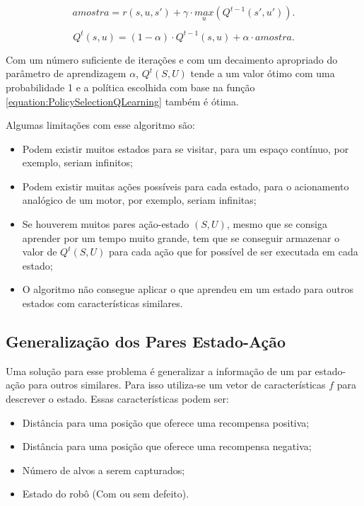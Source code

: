 \begin{equation} \label{equation:AmostraQLearning}
	amostra = r \left( s, u, s' \right) + \gamma \cdot \underset{u}{max} \left( Q^{t-1} \left( s', u' \right) \right).
\end{equation}

\begin{equation} \label{equation:QUpdateQLearning}
	Q^t \left( s, u \right) = \left( 1 - \alpha \right) \cdot Q^{t-1} \left( s, u \right) + \alpha \cdot amostra.
\end{equation}

Com um número suficiente de iterações e com um decaimento apropriado do parâmetro de aprendizagem $ \alpha $, $ Q^t \left( S, U \right) $ tende a um valor ótimo  com uma probabilidade 1 \cite{journals:ml:Tsitsiklis94,Jaakkola94convergenceof,Watkins:1989} e a política escolhida com base na função \ref{equation:PolicySelectionQLearning} também é ótima.

Algumas limitações com esse algoritmo são:

\begin{itemize}
	\item Podem existir muitos estados para se visitar, para um espaço contínuo, por exemplo, seriam infinitos;
	\item Podem existir muitas ações possíveis para cada estado, para o acionamento analógico de um motor, por exemplo, seriam infinitas;
	\item Se houverem muitos pares ação-estado $ \left( S, U \right) $, mesmo que se consiga aprender por um tempo muito grande, tem que se conseguir armazenar o valor de $ Q^t \left( S, U \right) $ para cada ação que for possível de ser executada em cada estado;
	\item O algoritmo não consegue aplicar o que aprendeu em um estado para outros estados com características similares.
\end{itemize}

\subsection{Generalização dos Pares Estado-Ação} \label{subsection:GeneralizaçãoParesEstadoAção}

Uma solução para esse problema é generalizar a informação de um par estado-ação para outros similares. Para isso utiliza-se um vetor de características $ f $ para descrever o estado. Essas características podem ser:

\begin{itemize}
	\item Distância para uma posição que oferece uma recompensa positiva;
	\item Distância para uma posição que oferece uma recompensa negativa;
	\item Número de alvos a serem capturados;
	\item Estado do robô (Com ou sem defeito).
\end{itemize}

